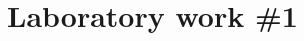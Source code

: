 \documentclass[12pt,a4paper,titlepage]{article}
\begin{document}
\begin{titlepage}
\begin{center}
      \vspace{5 mm}






      \vfill %
      \end{center}
      
\end{titlepage}

\cleardoublepage

\newpage

\setcounter{page}{1}
\setcounter{secnumdepth}{4}

\cleardoublepage


{}
\section*{Laboratory work \#1}

\end{document}
